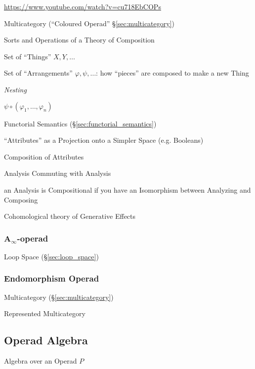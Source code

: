 \url{https://www.youtube.com/watch?v=cu718EbCOPs}


Multicategory (``Coloured Operad'' \S\ref{sec:multicategory})

Sorts and Operations of a Theory of Composition

Set of ``Things'' $X,Y,\ldots$

Set of ``Arrangements'' $\varphi,\psi,\ldots$: how ``pieces'' are
composed to make a new Thing

\emph{Nesting}

$\psi \circ (\varphi_1, \ldots, \varphi_n)$

Functorial Semantics (\S\ref{sec:functorial_semantics})

``Attributes'' as a Projection onto a Simpler Space (e.g. Booleans)

Composition of Attributes

Analysis Commuting with Analysis

an Analysis is Compositional if you have an Isomorphism between
Analyzing and Composing

Cohomological theory of Generative Effects



\subsubsection{A$_\infty$-operad}\label{sec:a_infinity_operad}

Loop Space (\S\ref{sec:loop_space})



\subsubsection{Endomorphism Operad}\label{sec:endomorphism_operad}

Multicategory (\S\ref{sec:multicategory})

Represented Multicategory



\subsection{Operad Algebra}\label{sec:operad_algebra}

Algebra over an Operad $P$

